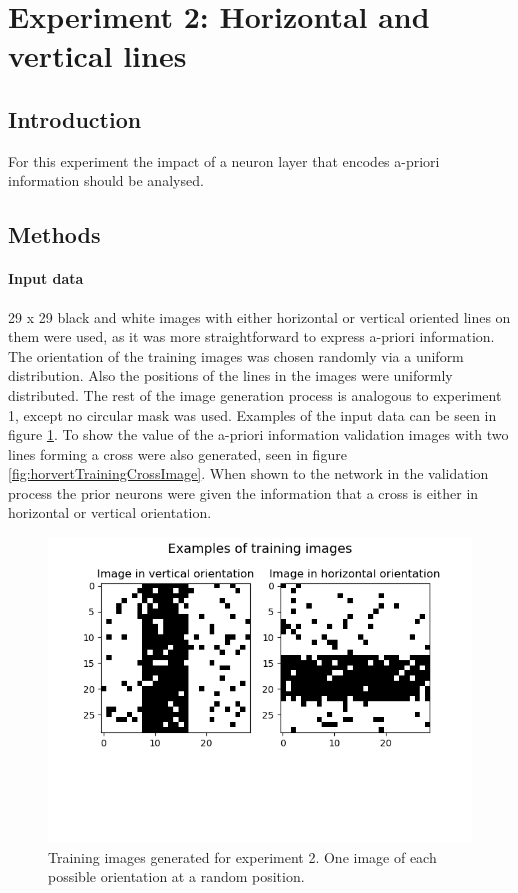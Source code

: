 \section{Experiment 2: Horizontal and vertical lines}

\subsection{Introduction}

For this experiment the impact of a neuron layer that encodes a-priori information should be analysed.

\subsection{Methods}

\paragraph{Input data}
29 x 29 black and white images with either horizontal or vertical oriented lines on them were used, as it was more straightforward to express a-priori information. The orientation of the training images was chosen randomly via a uniform distribution. Also the positions of the lines in the images were uniformly distributed. The rest of the image generation process is analogous to experiment 1, except no circular mask was used. Examples of the input data can be seen in figure \ref{fig:horvertImages}. To show the value of the a-priori information validation images with two lines forming a cross were also generated, seen in figure \ref{fig:horvertTrainingCrossImage}. When shown to the network in the validation process the prior neurons were given the information that a cross is either in horizontal or vertical orientation.

\begin{figure}
  \includegraphics[width=\linewidth]{figures/horvert/horvertTrainingImages.png}
  \caption{Training images generated for experiment 2. One image of each possible orientation at a random position.}
  \label{fig:horvertImages}
\end{figure}

